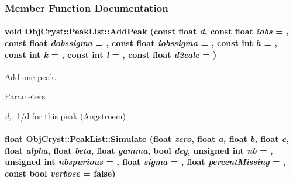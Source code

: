 \subsubsection{Member Function Documentation}
\paragraph[{AddPeak}]{\setlength{\rightskip}{0pt plus 5cm}void ObjCryst::PeakList::AddPeak (const float {\em d}, \/  const float {\em iobs} = {}, \/  const float {\em dobssigma} = {}, \/  const float {\em iobssigma} = {}, \/  const int {\em h} = {}, \/  const int {\em k} = {}, \/  const int {\em l} = {}, \/  const float {\em d2calc} = {})}\hfill\label{a00059_a825e83f775144bdbe0d558789af02d97}


Add one peak. 
\begin{DoxyParams}{Parameters}
\item[{\em d,:}]1/d for this peak (Angstroem) \end{DoxyParams}
\paragraph[{Simulate}]{\setlength{\rightskip}{0pt plus 5cm}float ObjCryst::PeakList::Simulate (float {\em zero}, \/  float {\em a}, \/  float {\em b}, \/  float {\em c}, \/  float {\em alpha}, \/  float {\em beta}, \/  float {\em gamma}, \/  bool {\em deg}, \/  unsigned int {\em nb} = {}, \/  unsigned int {\em nbspurious} = {}, \/  float {\em sigma} = {}, \/  float {\em percentMissing} = {}, \/  const bool {\em verbose} = {\ttfamily false})}\hfill\label{a00059_a88b5e22d20e07c1392b7b3916a9f58fe}


